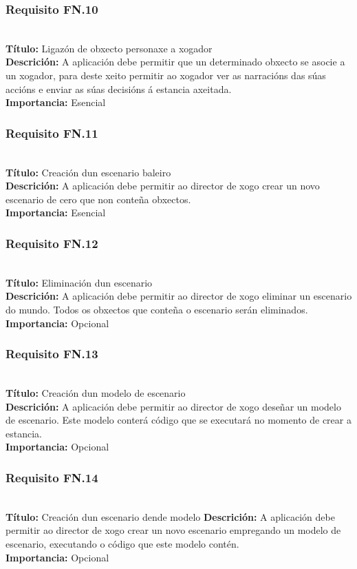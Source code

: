 \subsubsection{Requisito FN.10}~\\
{\bf Título:} Ligazón de obxecto personaxe a xogador\\
{\bf Descrición:} A aplicación debe permitir que un determinado obxecto se
asocie a un xogador, para deste xeito permitir ao xogador ver as narracións das
súas accións e enviar as súas decisións á estancia axeitada.\\
{\bf Importancia:} Esencial

\subsubsection{Requisito FN.11}~\\
{\bf Título:} Creación dun escenario baleiro\\
{\bf Descrición:} A aplicación debe permitir ao director de xogo crear un novo
escenario de cero que non conteña obxectos.\\
{\bf Importancia:} Esencial

\subsubsection{Requisito FN.12}~\\
{\bf Título:} Eliminación dun escenario\\
{\bf Descrición:} A aplicación debe permitir ao director de xogo eliminar un
escenario do mundo. Todos os obxectos que conteña o escenario serán eliminados.\\
{\bf Importancia:} Opcional

\subsubsection{Requisito FN.13}~\\
{\bf Título:} Creación dun modelo de escenario\\
{\bf Descrición:} A aplicación debe permitir ao director de xogo deseñar un
modelo de escenario. Este modelo conterá código que se executará no momento de
crear a estancia.\\
{\bf Importancia:} Opcional

\subsubsection{Requisito FN.14}~\\
{\bf Título:} Creación dun escenario dende modelo
{\bf Descrición:} A aplicación debe permitir ao director de xogo crear un novo
escenario empregando un modelo de escenario, executando o código que este modelo contén.\\
{\bf Importancia:} Opcional


